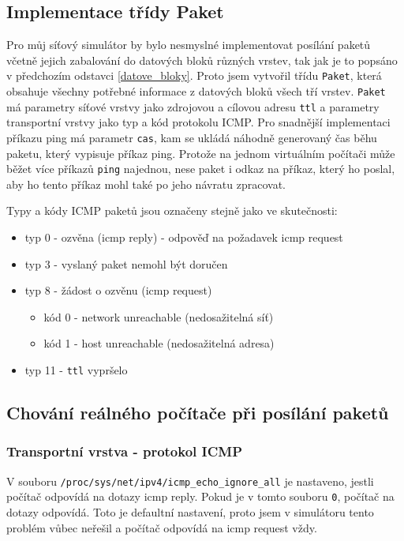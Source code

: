 \subsection{Implementace třídy Paket}
Pro můj síťový simulátor by bylo nesmyslné implementovat posílání paketů včetně jejich zabalování do datových bloků různých vrstev, tak jak je to popsáno v předchozím odstavci \ref{datove_bloky}. Proto jsem vytvořil třídu \verb|Paket|, která obsahuje všechny potřebné informace z datových bloků všech tří vrstev. \verb|Paket| má parametry síťové vrstvy jako zdrojovou a cílovou adresu \verb|ttl| a parametry transportní vrstvy jako typ a kód protokolu ICMP. Pro snadnější implementaci příkazu ping má parametr \verb|cas|, kam se ukládá náhodně generovaný čas běhu paketu, který vypisuje příkaz ping. Protože na jednom virtuálním počítači může běžet více příkazů \verb|ping| najednou, nese paket i odkaz na příkaz, který ho poslal, aby ho tento příkaz mohl také po jeho návratu zpracovat.

Typy a kódy ICMP paketů jsou označeny stejně jako ve skutečnosti:
\begin{itemize}
\item typ 0 - ozvěna (icmp reply) - odpověď na požadavek icmp request
\item typ 3 - vyslaný paket nemohl být doručen
\item typ 8 - žádost o ozvěnu (icmp request)
\begin{itemize}
\item kód 0 - network unreachable (nedosažitelná síť)
\item kód 1 - host unreachable (nedosažitelná adresa)
\end{itemize}
\item typ 11 - \verb|ttl| vypršelo
\end{itemize}


\subsection{Chování reálného počítače při posílání paketů}

\subsubsection{Transportní vrstva - protokol ICMP}

V souboru \verb|/proc/sys/net/ipv4/icmp_echo_ignore_all| je nastaveno, jestli počítač odpovídá na dotazy icmp reply. Pokud je v tomto souboru \verb|0|, počítač na dotazy odpovídá. Toto je defaultní nastavení, proto jsem v simulátoru tento problém vůbec neřešil a počítač odpovídá na icmp request vždy.


